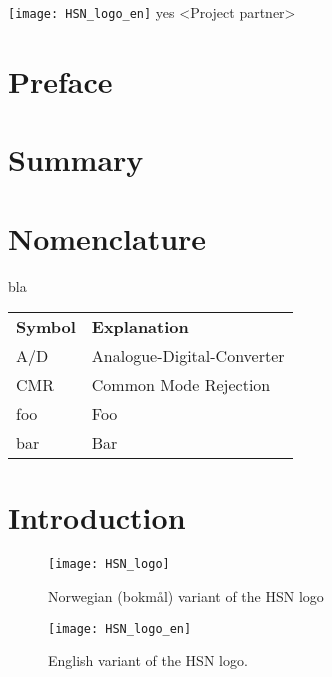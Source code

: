 \documentclass[%
]{USN-MSc}
\begin{document}
\USNtitlepage%
{\vfill
  {}
   \texttt{[image: HSN\_logo\_en]}}
{} %
{yes} %
{<Project partner>}
{%
\lipsum[6-7]
}

\chapter*{Preface}
\label{sec:preface}
\lipsum[1-3]

\chapter*{Summary}
\label{sec:summary}
\lipsum[1-3]

\tableofcontents
{}

\listoffigures %

\listoftables  %

\chapter*{Nomenclature}
\label{sec:nomenclature}
bla

\begin{longtable}{ll}
  \textbf{Symbol} & \textbf{Explanation}\endhead\\
  A/D	& Analogue-Digital-Converter \\
  CMR	& Common Mode Rejection \\
  foo	& Foo \\
  bar 	& Bar
\end{longtable}

\chapter{Introduction}
\label{ch:intro}
\lipsum[4]
\begin{figure}[!ht]
  \centering
  \texttt{[image: HSN\_logo]}
  \caption{Norwegian (bokmål) variant of the HSN logo}
  \label{fig:hsn-logo}
\end{figure}
\lipsum[4]
\begin{figure}[!ht]
  \centering
  \texttt{[image: HSN\_logo\_en]}
  \caption{English variant of the HSN logo.}
  \label{fig:hsn-logo-en}
\end{figure}
\lipsum
\end{document}
